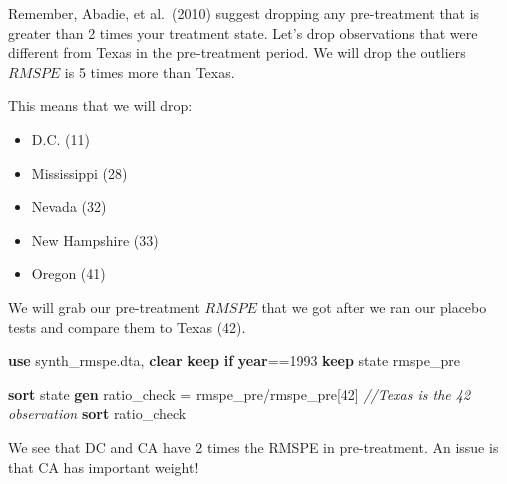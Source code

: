 \documentclass[
]{book}
\newenvironment{Shaded}{\begin{snugshade}}{\end{snugshade}}
\newcommand{\CommentTok}[1]{\textcolor[rgb]{0.56,0.35,0.01}{\textit{#1}}}
\newcommand{\FunctionTok}[1]{\textcolor[rgb]{0.13,0.29,0.53}{\textbf{#1}}}
\newcommand{\KeywordTok}[1]{\textcolor[rgb]{0.13,0.29,0.53}{\textbf{#1}}}
\newcommand{\NormalTok}[1]{#1}
\providecommand{\tightlist}{%
  \setlength{\itemsep}{0pt}\setlength{\parskip}{0pt}}
\begin{document}
Remember, Abadie, et al.~(2010) suggest dropping any pre-treatment that is greater than 2 times your treatment state. Let's drop observations that were different from Texas in the pre-treatment period. We will drop the outliers \(RMSPE\) is 5 times more than Texas.

This means that we will drop:

\begin{itemize}
\tightlist
\item
  D.C. (11)
\item
  Mississippi (28)
\item
  Nevada (32)
\item
  New Hampshire (33)
\item
  Oregon (41)
\end{itemize}

We will grab our pre-treatment \(RMSPE\) that we got after we ran our placebo tests and compare them to Texas (42).

\begin{Shaded}
\begin{Highlighting}[]
\KeywordTok{use}\NormalTok{ synth\_rmspe.dta, }\KeywordTok{clear}
\KeywordTok{keep} \KeywordTok{if} \FunctionTok{year}\NormalTok{==1993}
\KeywordTok{keep}\NormalTok{ state rmspe\_pre}

\KeywordTok{sort}\NormalTok{ state}
\KeywordTok{gen}\NormalTok{ ratio\_check = rmspe\_pre/rmspe\_pre[42] }\CommentTok{//Texas is the 42 observation}
\KeywordTok{sort}\NormalTok{ ratio\_check}
\end{Highlighting}
\end{Shaded}

We see that DC and CA have 2 times the RMSPE in pre-treatment. An issue is that CA has important weight!
\end{document}
